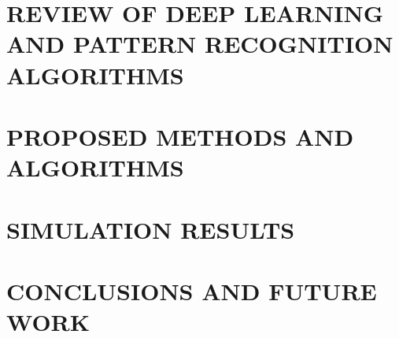 \documentclass[14pt,epsfig,times]{report}
\begin{document}
\chapter{REVIEW OF DEEP LEARNING AND PATTERN RECOGNITION ALGORITHMS}\label{ch3}


\chapter{PROPOSED METHODS AND ALGORITHMS}\label{ch4}


\chapter{SIMULATION RESULTS}\label{ch5}


\chapter{CONCLUSIONS AND FUTURE WORK}\label{ch6}

%

\begin{thebibliography}{9}


\end{thebibliography}
\end{document}
